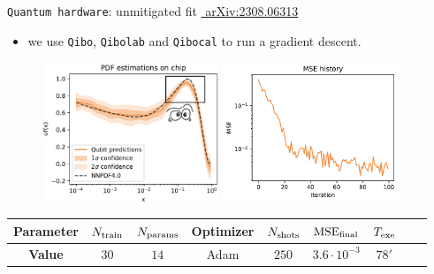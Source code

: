 \documentclass[8pt, xcolor={svgnames}, hyperref={linkcolor=black}, aspectratio=169]{beamer}
\begin{document}
\begin{frame}{\texttt{Quantum hardware}: unmitigated fit \hfill \href{https://arxiv.org/abs/2308.06313}{\faBook\,\,arXiv:2308.06313}}
\begin{itemize}[noitemsep]
\item[\faGamepad] we use \texttt{Qibo}, \texttt{Qibolab} and \texttt{Qibocal} to run a gradient descent.
\end{itemize}
\begin{figure}  
  \includegraphics[width=0.47\textwidth]{figures/emo.png}%
  \includegraphics[width=0.47\textwidth]{figures/loss.pdf}%
\end{figure}
\begin{table}[ht]
\centering
\begin{tabular}{ccccccccc}
\hline \hline 
\rule{0pt}{2.5ex}
\textbf{Parameter} & $N_{\rm train}$ & $N_{\rm params}$ & Optimizer & $N_{\rm shots}$ & $\text{MSE}_{\rm final}$ & $T_{\rm exe}$ \\
\hline
\rule{0pt}{2.5ex}
\textbf{Value} & $30$ & $14$ & Adam & $250$ & $3.6\cdot 10^{-3}$ & $78'$ \\
\hline \hline 
\end{tabular}
\label{tab:qml}
\end{table}
\end{frame}
\end{document}
